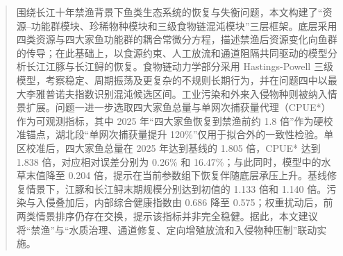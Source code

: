 \documentclass{MMCStyle}
\begin{document}
\begin{abstract}
围绕长江十年禁渔背景下鱼类生态系统的恢复与失衡问题，本文构建了“资源--功能群模块、珍稀物种模块和三级食物链混沌模块”三层框架。底层采用四类资源与四大家鱼功能群的耦合常微分方程，描述禁渔后资源变化向鱼群的传导；在此基础上，以食源约束、人工放流和通道阻隔共同驱动的模型分析长江江豚与长江鲟的恢复。食物链动力学部分采用 Hastings-Powell 三级模型，考察稳定、周期振荡及更复杂的不规则长期行为，并在问题四中以最大李雅普诺夫指数识别混沌候选区间。工业污染和外来入侵物种则被纳入情景扩展。问题一进一步选取四大家鱼总量与单网次捕获量代理（CPUE*）作为可观测指标，其中 2025 年“四大家鱼恢复到禁渔前约 1.8 倍”作为硬校准锚点，湖北段“单网次捕获量提升 120\%”仅用于拟合外的一致性检验。单区校准后，四大家鱼总量在 2025 年达到基线的 1.805 倍，CPUE* 达到 1.838 倍，对应相对误差分别为 0.26\% 和 16.47\%；与此同时，模型中的水草末值降至 0.204 倍，提示在当前参数组下恢复伴随底层承压上升。基线修复情景下，江豚和长江鲟末期规模分别达到初值的 1.133 倍和 1.140 倍。污染与入侵叠加后，内部综合健康指数由 0.686 降至 0.575；权重扰动后，前两类情景排序仍存在交换，提示该指标并非完全稳健。据此，本文建议将“禁渔”与“水质治理、通道修复、定向增殖放流和入侵物种压制”联动实施。
\end{abstract}

\newpage
\tableofcontents
\newpage
{}
\pagestyle{fancy}
\end{document}

